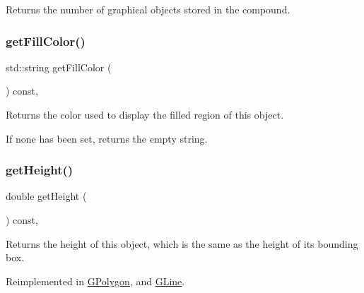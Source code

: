 Returns the number of graphical objects stored in the compound. 

\mbox{\label{classGObject_a76f6964a11fde7c78e9751be184e1a3c}} 
\subsubsection{\texorpdfstring{get\+Fill\+Color()}{getFillColor()}}
{\footnotesize\ttfamily std\+::string get\+Fill\+Color (\begin{DoxyParamCaption}{ }\end{DoxyParamCaption}) const\hspace{0.3cm}{\ttfamily [virtual]}, {\ttfamily [inherited]}}



Returns the color used to display the filled region of this object. 

If none has been set, returns the empty string. \mbox{\label{classGObject_a1e7e353362434072875264cf95629f99}} 
\subsubsection{\texorpdfstring{get\+Height()}{getHeight()}}
{\footnotesize\ttfamily double get\+Height (\begin{DoxyParamCaption}{ }\end{DoxyParamCaption}) const\hspace{0.3cm}{\ttfamily [virtual]}, {\ttfamily [inherited]}}



Returns the height of this object, which is the same as the height of its bounding box. 



Reimplemented in \mbox{\hyperlink{classGPolygon_a1e7e353362434072875264cf95629f99}{G\+Polygon}}, and \mbox{\hyperlink{classGLine_a423f17d4aeb66feb0d148fd23af335b7}{G\+Line}}.

\mbox{\label{classGObject_aaf1f5ea8281e5e3486662878d26f0a13}} 
